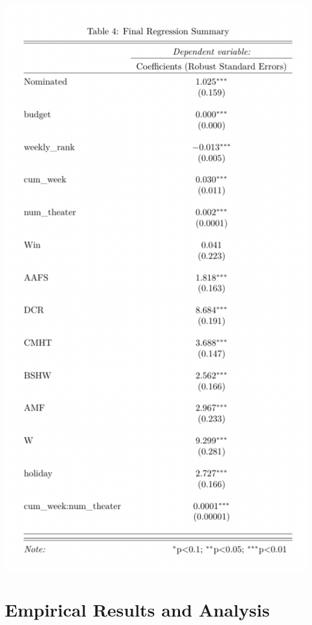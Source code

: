 \documentclass[11pt]{article} %
\begin{document}
\begin{center}
    \includegraphics[scale = 1.0]{Regression Output.png}
\end{center}

\section{Empirical Results and Analysis}
\end{document}
